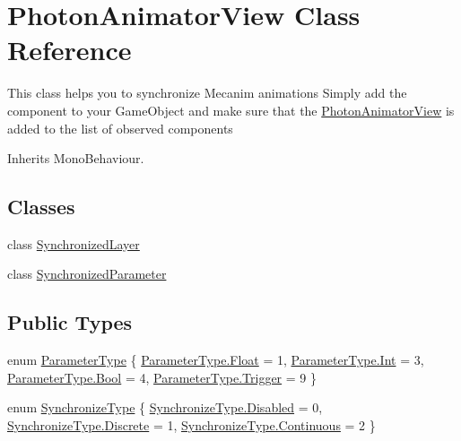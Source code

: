 \hypertarget{class_photon_animator_view}{}\section{Photon\+Animator\+View Class Reference}
\label{class_photon_animator_view}


This class helps you to synchronize Mecanim animations Simply add the component to your Game\+Object and make sure that the \hyperlink{class_photon_animator_view}{Photon\+Animator\+View} is added to the list of observed components  




Inherits Mono\+Behaviour.

\subsection*{Classes}
\begin{DoxyCompactItemize}
\item 
class \hyperlink{class_photon_animator_view_1_1_synchronized_layer}{Synchronized\+Layer}
\item 
class \hyperlink{class_photon_animator_view_1_1_synchronized_parameter}{Synchronized\+Parameter}
\end{DoxyCompactItemize}
\subsection*{Public Types}
\begin{DoxyCompactItemize}
\item 
enum \hyperlink{class_photon_animator_view_aa41dc91e8da385b9f10cf9bf5dc47894}{Parameter\+Type} \{ \hyperlink{class_photon_animator_view_aa41dc91e8da385b9f10cf9bf5dc47894a22ae0e2b89e5e3d477f988cc36d3272b}{Parameter\+Type.\+Float} = 1, 
\hyperlink{class_photon_animator_view_aa41dc91e8da385b9f10cf9bf5dc47894a1686a6c336b71b36d77354cea19a8b52}{Parameter\+Type.\+Int} = 3, 
\hyperlink{class_photon_animator_view_aa41dc91e8da385b9f10cf9bf5dc47894ac26f15e86e3de4c398a8273272aba034}{Parameter\+Type.\+Bool} = 4, 
\hyperlink{class_photon_animator_view_aa41dc91e8da385b9f10cf9bf5dc47894af698f67f5666aff10729d8a1cb1c14d2}{Parameter\+Type.\+Trigger} = 9
 \}
\item 
enum \hyperlink{class_photon_animator_view_ae3ad07de936a811cbb923adffe1f167f}{Synchronize\+Type} \{ \hyperlink{class_photon_animator_view_ae3ad07de936a811cbb923adffe1f167fab9f5c797ebbf55adccdd8539a65a0241}{Synchronize\+Type.\+Disabled} = 0, 
\hyperlink{class_photon_animator_view_ae3ad07de936a811cbb923adffe1f167fa4984667940802dedc139aa7a430a6553}{Synchronize\+Type.\+Discrete} = 1, 
\hyperlink{class_photon_animator_view_ae3ad07de936a811cbb923adffe1f167fa535863a82f163709557e59e2eb8139a7}{Synchronize\+Type.\+Continuous} = 2
 \}
\end{DoxyCompactItemize}
